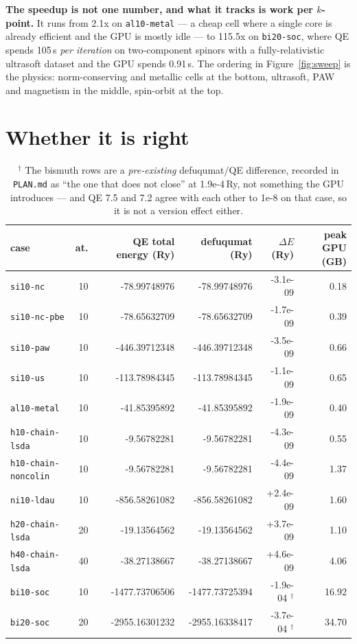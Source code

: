 \documentclass[11pt,a4paper]{article}
\begin{document}
\textbf{The speedup is not one number, and what it tracks is work per $k$-point.}
It runs from 2.1x on \texttt{al10-metal} --- a cheap cell where a single core is
already efficient and the GPU is mostly idle --- to 115.5x on \texttt{bi20-soc},
where QE spends 105\,s \emph{per iteration} on two-component spinors with a
fully-relativistic ultrasoft dataset and the GPU spends 0.91\,s. The
ordering in Figure~\ref{fig:sweep} is the physics: norm-conserving and metallic
cells at the bottom, ultrasoft, PAW and magnetism in the middle, spin-orbit at
the top.

\section*{Whether it is right}

\begin{table}[htbp]
\centering
\small
\begin{tabular}{lrrrrr}
\toprule
case & at. & QE total energy (Ry) & defuqumat (Ry) & $\Delta E$ (Ry) & peak GPU (GB) \\
\midrule
\texttt{si10-nc} & 10 & -78.99748976 & -78.99748976 & -3.1e-09 & 0.18 \\
\texttt{si10-nc-pbe} & 10 & -78.65632709 & -78.65632709 & -1.7e-09 & 0.39 \\
\texttt{si10-paw} & 10 & -446.39712348 & -446.39712348 & -3.5e-09 & 0.66 \\
\texttt{si10-us} & 10 & -113.78984345 & -113.78984345 & -1.1e-09 & 0.65 \\
\texttt{al10-metal} & 10 & -41.85395892 & -41.85395892 & -1.9e-09 & 0.40 \\
\texttt{h10-chain-lsda} & 10 & -9.56782281 & -9.56782281 & -4.3e-09 & 0.55 \\
\texttt{h10-chain-noncolin} & 10 & -9.56782281 & -9.56782281 & -4.4e-09 & 1.37 \\
\texttt{ni10-ldau} & 10 & -856.58261082 & -856.58261082 & +2.4e-09 & 1.60 \\
\texttt{h20-chain-lsda} & 20 & -19.13564562 & -19.13564562 & +3.7e-09 & 1.10 \\
\texttt{h40-chain-lsda} & 40 & -38.27138667 & -38.27138667 & +4.6e-09 & 4.06 \\
\texttt{bi10-soc} & 10 & -1477.73706506 & -1477.73725394 & -1.9e-04 $^\dagger$ & 16.92 \\
\texttt{bi20-soc} & 20 & -2955.16301232 & -2955.16338417 & -3.7e-04 $^\dagger$ & 34.70 \\
\bottomrule
\end{tabular}
\caption{$^\dagger$ The bismuth rows are a \emph{pre-existing} defuqumat/QE
difference, recorded in \texttt{PLAN.md} as ``the one that does not close'' at
1.9e-4\,Ry, not something the GPU introduces --- and QE 7.5 and 7.2 agree with
each other to 1e-8 on that case, so it is not a version effect either.}
\label{tab:energy}
\end{table}
\end{document}
